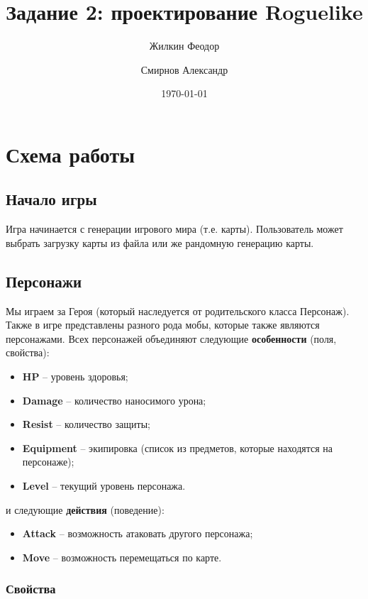 \documentclass[a4paper,10pt]{article}
\title{Задание 2: проектирование Roguelike}
\author{
	Жилкин Феодор\\
	\and
	Смирнов Александр
}
\date{\today}
\begin{document}
\maketitle

\section*{Схема работы}

\subsection*{Начало игры}

Игра начинается с генерации игрового мира (т.е. карты). Пользователь может выбрать загрузку карты из файла или же рандомную генерацию карты. 

\subsection*{Персонажи}

Мы играем за Героя (который наследуется от родительского класса Персонаж). Также в игре представлены разного рода мобы, которые также являются персонажами. 
Всех персонажей объединяют следующие \textbf{особенности} (поля, свойства): 

\begin{itemize}
    \item \textbf{HP} -- уровень здоровья;
    \item \textbf{Damage} -- количество наносимого урона;
    \item \textbf{Resist} -- количество защиты;
    \item \textbf{Equipment} -- экипировка (список из предметов, которые находятся на персонаже);
    \item \textbf{Level} -- текущий уровень персонажа.
\end{itemize}


и следующие \textbf{действия} (поведение):


\begin{itemize}
    \item \textbf{Attack} -- возможность атаковать другого персонажа;
    \item \textbf{Move} -- возможность перемещаться по карте.
\end{itemize}

\subsubsection*{Свойства}
\end{document}
